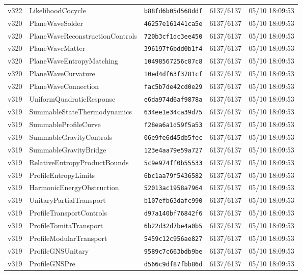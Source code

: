 \documentclass[11pt]{article}
\theoremstyle{definition}\newtheorem{deriv}{Derivação}
\begin{document}
{\begin{longtable}{@{}lllll@{}}
v322 & LikelihoodCocycle & \texttt{b88fd6b05d568ddf} & 6137/6137 & 05/10 18:09:53 \\
v320 & PlaneWaveSolder & \texttt{46257e161441ca5e} & 6137/6137 & 05/10 18:09:53 \\
v320 & PlaneWaveReconstructionControls & \texttt{720b3cf1dc3ee450} & 6137/6137 & 05/10 18:09:53 \\
v320 & PlaneWaveMatter & \texttt{396197f6bdd0b1f4} & 6137/6137 & 05/10 18:09:53 \\
v320 & PlaneWaveEntropyMatching & \texttt{10498567256c87c8} & 6137/6137 & 05/10 18:09:53 \\
v320 & PlaneWaveCurvature & \texttt{10ed4df63f3781cf} & 6137/6137 & 05/10 18:09:53 \\
v320 & PlaneWaveConnection & \texttt{fac5b7de42cd0e29} & 6137/6137 & 05/10 18:09:53 \\
v319 & UniformQuadraticResponse & \texttt{e6da974d6af9878a} & 6137/6137 & 05/10 18:09:53 \\
v319 & SummableStateThermodynamics & \texttt{634ee1e34ca39d75} & 6137/6137 & 05/10 18:09:53 \\
v319 & SummableProfileCurve & \texttt{f28ea6a1d59f5a53} & 6137/6137 & 05/10 18:09:53 \\
v319 & SummableGravityControls & \texttt{06e9fe6d45db5fec} & 6137/6137 & 05/10 18:09:53 \\
v319 & SummableGravityBridge & \texttt{123e4aa79e59a727} & 6137/6137 & 05/10 18:09:53 \\
v319 & RelativeEntropyProductBounds & \texttt{5c9e974ff0b55533} & 6137/6137 & 05/10 18:09:53 \\
v319 & ProfileEntropyLimits & \texttt{6bc1aa79f5436582} & 6137/6137 & 05/10 18:09:53 \\
v319 & HarmonicEnergyObstruction & \texttt{52013ac1958a7964} & 6137/6137 & 05/10 18:09:53 \\
v319 & UnitaryPartialTransport & \texttt{b107efb63dafc990} & 6137/6137 & 05/10 18:09:53 \\
v319 & ProfileTransportControls & \texttt{d97a140bf76842f6} & 6137/6137 & 05/10 18:09:53 \\
v319 & ProfileTomitaTransport & \texttt{6b22d32d7be4a0b5} & 6137/6137 & 05/10 18:09:53 \\
v319 & ProfileModularTransport & \texttt{5459c12c956ae827} & 6137/6137 & 05/10 18:09:53 \\
v319 & ProfileGNSUnitary & \texttt{9589c7c663bdb9be} & 6137/6137 & 05/10 18:09:53 \\
v319 & ProfileGNSPre & \texttt{d566c9df87fbb86d} & 6137/6137 & 05/10 18:09:53 \\

\end{longtable}}
\end{document}
